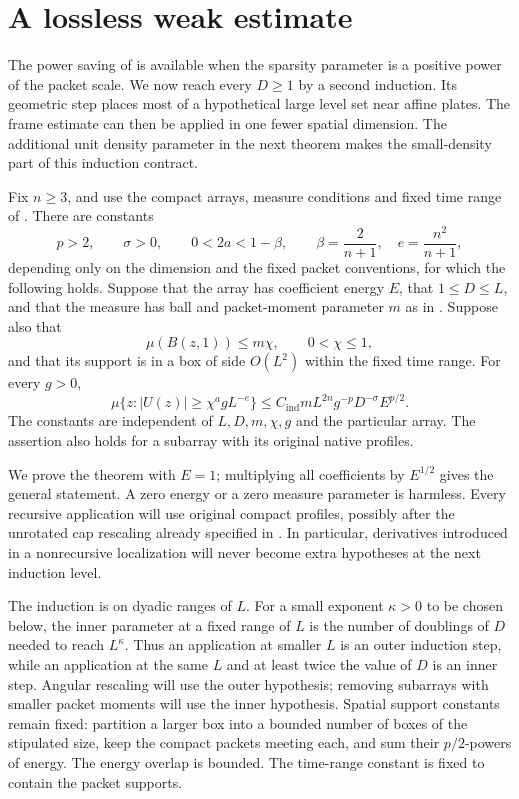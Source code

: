 \section{A lossless weak estimate}\label{sec:weak}

The power saving of  is available when the sparsity
parameter is a positive power of the packet scale.  We now reach every
$D\geq1$ by a second induction.  Its geometric step places most of a
hypothetical large level set near affine plates.  The frame estimate can
then be applied in one fewer spatial dimension.  The additional unit
density parameter in the next theorem makes the small-density part of
this induction contract.

\begin{theorem}\label{w:weak}
Fix $n\geq3$, and use the compact arrays, measure conditions and fixed
time range of .  There are constants
\[
 p>2,\qquad \sigma>0,\qquad 0<2a<1-\beta,
 \qquad \beta=\frac2{n+1},\quad e=\frac{n^2}{n+1},
\]
depending only on the dimension and the fixed packet conventions, for
which the following holds.  Suppose that the array has coefficient
energy $E$, that $1\leq D\leq L$, and that the measure has ball and
packet-moment parameter $m$ as in .  Suppose also that
\[
 \mu(B(z,1))\leq m\chi,\qquad 0<\chi\leq1,
\]
and that its support is in a box of side $O(L^2)$ within the fixed time
range.  For every $g>0$,
\begin{equation}\label{w:eq-weak}
 \mu\{z:|U(z)|\geq \chi^a gL^{-e}\}
 \leq C_{\mathrm{ind}}mL^{2n}g^{-p}D^{-\sigma}E^{p/2}.
\end{equation}
The constants are independent of $L,D,m,\chi,g$ and the particular
array.  The assertion also holds for a subarray with its original
native profiles.
\end{theorem}

We prove the theorem with $E=1$; multiplying all coefficients by
$E^{1/2}$ gives the general statement.  A zero energy or a zero measure
parameter is harmless.  Every recursive application will use original
compact profiles, possibly after the unrotated cap rescaling already
specified in .  In particular, derivatives introduced
in a nonrecursive localization will never become extra hypotheses at
the next induction level.

The induction is on dyadic ranges of $L$.  For a small exponent
$\kappa>0$ to be chosen below, the inner parameter at a fixed range
of $L$ is the number of doublings of $D$ needed to reach $L^\kappa$.  Thus an application at smaller $L$ is an outer induction
step, while an application at the same $L$ and at least twice the
value of $D$ is an inner step.  Angular rescaling will use the outer
hypothesis; removing subarrays with smaller packet moments will use
the inner hypothesis.  Spatial support constants remain fixed:
partition a larger box into a bounded number of boxes of the stipulated
size, keep the compact packets meeting each, and sum their
$p/2$-powers of energy.  The energy overlap is bounded.  The time-range
constant is fixed to contain the packet supports.

